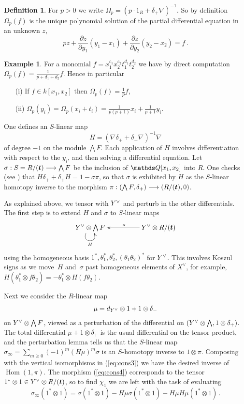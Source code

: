 \documentclass{compositio}
\theoremstyle{definition}
\newtheorem{definition}[theorem]{Definition}
\newtheorem{example}[theorem]{Example}
\numberwithin{equation}{section}
\def\Hom{\operatorname{Hom}}
\begin{document}
\begin{definition}\label{defn:omega} For $p > 0$ we write $\Omega_p = (p \cdot 1_R + \delta_{+} \nabla)^{-1}$. So by definition $\Omega_p(f)$ is the unique polynomial solution of the partial differential equation in an unknown $z$,
\[
p z + \frac{\partial z}{\partial y_1} (y_1 - x_1) + \frac{\partial z}{\partial y_2}(y_2 - x_2) = f \, .
\]
\end{definition}

\begin{example}\label{example:compomega} For a monomial $f = x_1^{c_1} x_2^{c_2} t_1^{d_1} t_2^{d_2}$ we have by direct computation $\Omega_p(f) = \frac{1}{p + d_1 + d_2} f$. Hence in particular
\begin{itemize}
\item[(i)] If $f \in k[x_1,x_2]$ then $\Omega_p(f) = \frac{1}{p} f$,
\item[(ii)] $\Omega_p(y_i) = \Omega_p(x_i + t_i) = \frac{1}{p(p+1)} x_i + \frac{1}{p+1} y_i$.
\end{itemize}
\end{example}

One defines an $S$-linear map
\[
H = (\nabla \delta_+ + \delta_+ \nabla)^{-1} \nabla
\]
of degree $-1$ on the module $\bigwedge F$. Each application of $H$ involves differentiation with respect to the $y_i$, and then solving a differential equation. Let $\sigma: S = R/(\boldsymbol{t}) \longrightarrow \bigwedge F$ be the inclusion of $\QQ[x_1,x_2]$ into $R$. One checks (see \cite[Section 8.1]{dm1102.2957}) that $H \delta_+ + \delta_+ H = 1 - \sigma \pi$, so that $\sigma$ is exhibited by $H$ as the $S$-linear homotopy inverse to the morphism $\pi: (\bigwedge F, \delta_+) \longrightarrow (R/(\boldsymbol{t}),0)$.

As explained above, we tensor with $Y^{\vee}$ and perturb in the other differentials. The first step is to extend $H$ and $\sigma$ to $S$-linear maps
\[
\xymatrix@C+2pc{
Y\mdual \otimes \bigwedge F \ar@(dl,dr)[]_{H} & Y\mdual \otimes R/(\boldsymbol{t}) \ar[l]_{\sigma}
}
\]
using the homogeneous basis $1^*, \theta_1^*, \theta_2^*, (\theta_1\theta_2)^*$ for $Y^{\vee}$. This involves Koszul signs as we move~$H$ and~$\sigma$ past homogeneous elements of $X^{\lor}$, for example, $H(\theta_1^* \otimes f \theta_2) = - \theta_1^* \otimes H(f \theta_2)$. 

Next we consider the $R$-linear map
\[
\mu = d_{Y^{\vee}} \otimes 1 + 1 \otimes \delta_{-}
\]
on $Y^{\vee} \otimes \bigwedge F$, viewed as a perturbation of the differential on $(Y^{\vee} \otimes \bigwedge, 1 \otimes \delta_{+})$. The total differential $\mu + 1 \otimes \delta_{+}$ is the usual differential on the tensor product, and the perturbation lemma tells us that the $S$-linear map $\sigma_\infty = \sum_{m \ge 0} (-1)^m (H \mu)^m \sigma$ is an $S$-homotopy inverse to $1 \otimes \pi$. Composing with the vertical isomorphisms in (\ref{eq:cons3}) we have the desired inverse of $\Hom(1,\pi)$. The morphism (\ref{eq:cons4}) corresponds to the tensor $1^* \otimes 1 \in Y^{\vee} \otimes R/(\boldsymbol{t})$, so to find $\chi_1$ we are left with the task of evaluating
\[
\sigma_\infty(1^* \otimes 1) = \sigma(1^* \otimes 1) - H \mu \sigma(1^* \otimes 1) + H \mu H \mu(1^* \otimes 1) \, .
\]
\end{document}
